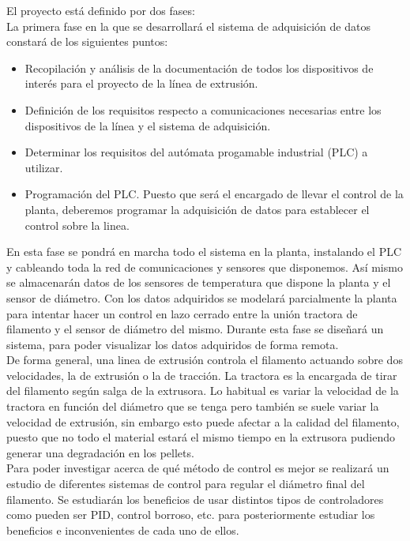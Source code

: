 El proyecto está definido por dos fases:\\

La primera fase en la que se desarrollará el sistema de adquisición de datos constará de los siguientes puntos:

\begin{itemize}
    \item Recopilación y análisis de la documentación de todos los dispositivos de interés para el proyecto de la línea de extrusión.
    \item Definición de los requisitos respecto a comunicaciones necesarias entre los dispositivos de la línea y el sistema de adquisición.
    \item Determinar los requisitos del autómata progamable industrial (PLC) a utilizar.
    \item Programación del PLC. Puesto que será el encargado de llevar el control de la planta, deberemos programar la adquisición de datos para establecer el control sobre la linea.
\end{itemize}

En esta fase se pondrá en marcha todo el sistema en la planta, instalando el PLC y cableando toda la red de comunicaciones y sensores que disponemos. Así mismo se almacenarán datos de los sensores de temperatura que dispone la planta y el sensor de diámetro. Con los datos adquiridos se modelará parcialmente la planta para intentar hacer un control en lazo cerrado entre la unión tractora de filamento y el sensor de diámetro del mismo. Durante esta fase se diseñará un sistema, para poder visualizar los datos adquiridos de forma remota.\\

De forma general, una linea de extrusión controla el filamento actuando sobre dos velocidades, la de extrusión o la de tracción. La tractora es la encargada de tirar del filamento según salga de la extrusora. Lo habitual es variar la velocidad de la tractora en función del diámetro que se tenga pero también se suele variar la velocidad de extrusión, sin embargo esto puede afectar a la calidad del filamento, puesto que no todo el material estará el mismo tiempo en la extrusora pudiendo generar una degradación en los pellets.\\

Para poder investigar acerca de qué método de control es mejor se realizará un estudio de diferentes sistemas de control para regular el diámetro final del filamento. Se estudiarán los beneficios de usar distintos tipos de controladores como pueden ser PID, control borroso, etc. para posteriormente estudiar los beneficios e inconvenientes de cada uno de ellos.\\

